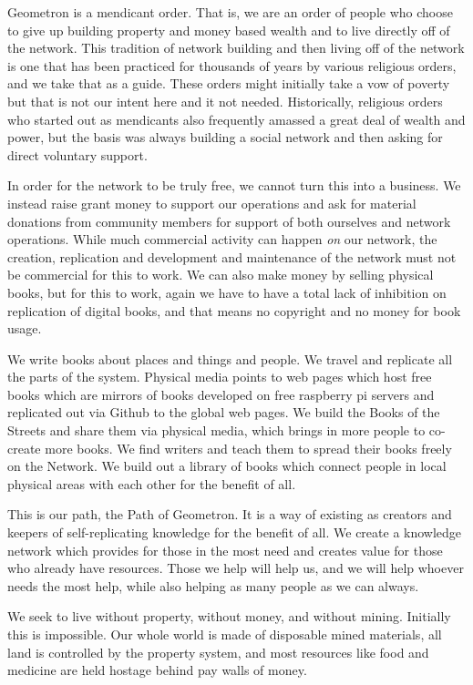 Geometron is a mendicant order. That is, we are an order of people who
choose to give up building property and money based wealth and to live
directly off of the network. This tradition of network building and then
living off of the network is one that has been practiced for thousands
of years by various religious orders, and we take that as a guide. These
orders might initially take a vow of poverty but that is not our intent
here and it not needed. Historically, religious orders who started out
as mendicants also frequently amassed a great deal of wealth and power,
but the basis was always building a social network and then asking for
direct voluntary support.

In order for the network to be truly free, we cannot turn this into a
business. We instead raise grant money to support our operations and ask
for material donations from community members for support of both
ourselves and network operations. While much commercial activity can
happen \emph{on} our network, the creation, replication and development
and maintenance of the network must not be commercial for this to work.
We can also make money by selling physical books, but for this to work,
again we have to have a total lack of inhibition on replication of
digital books, and that means no copyright and no money for book usage.

We write books about places and things and people. We travel and
replicate all the parts of the system. Physical media points to web
pages which host free books which are mirrors of books developed on free
raspberry pi servers and replicated out via Github to the global web
pages. We build the Books of the Streets and share them via physical
media, which brings in more people to co-create more books. We find
writers and teach them to spread their books freely on the Network. We
build out a library of books which connect people in local physical
areas with each other for the benefit of all.

This is our path, the Path of Geometron. It is a way of existing as
creators and keepers of self-replicating knowledge for the benefit of
all. We create a knowledge network which provides for those in the most
need and creates value for those who already have resources. Those we
help will help us, and we will help whoever needs the most help, while
also helping as many people as we can always.

We seek to live without property, without money, and without mining.
Initially this is impossible. Our whole world is made of disposable
mined materials, all land is controlled by the property system, and most
resources like food and medicine are held hostage behind pay walls of
money.

